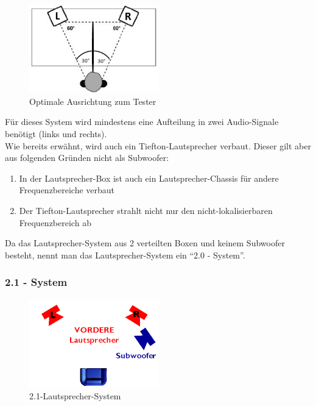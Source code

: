 \begin{figure} [H]
	\centering
	\includegraphics[width=0.5\textwidth]{img/Grundlagen/Mehrweg-Lautsprechersysteme/opt-20-aufstellung.jpg}
	\caption[Optimale Ausrichtung zum Tester]{Optimale Ausrichtung zum Tester\footnotemark}
	\label{fig:3.2.4}
\end{figure}

Für dieses System wird mindestens eine Aufteilung in zwei Audio-Signale benötigt (links und rechts).\\
Wie bereits erwähnt, wird auch ein Tiefton-Lautsprecher verbaut.
Dieser gilt aber aus folgenden Gründen nicht als Subwoofer:
\begin{enumerate}
	\item In der Lautsprecher-Box ist auch ein Lautsprecher-Chassis für andere Frequenzbereiche verbaut
	\item Der Tiefton-Lautsprecher strahlt nicht nur den nicht-lokalisierbaren Frequenzbereich ab
\end{enumerate}
Da das Lautsprecher-System aus 2 verteilten Boxen und keinem Subwoofer besteht, nennt man das Lautsprecher-System ein \enquote{2.0 - System}.


\newpage
\subsubsection*{2.1 - System}
\begin{figure} [H]
	\centering
	\includegraphics[width=0.5\textwidth]{img/Grundlagen/Mehrweg-Lautsprechersysteme/DOLBYDigital21-cut.jpg}
	\caption[2.1-Lautsprecher-System]{2.1-Lautsprecher-System\footnotemark}
	\label{fig:3.2.5}
\end{figure}

